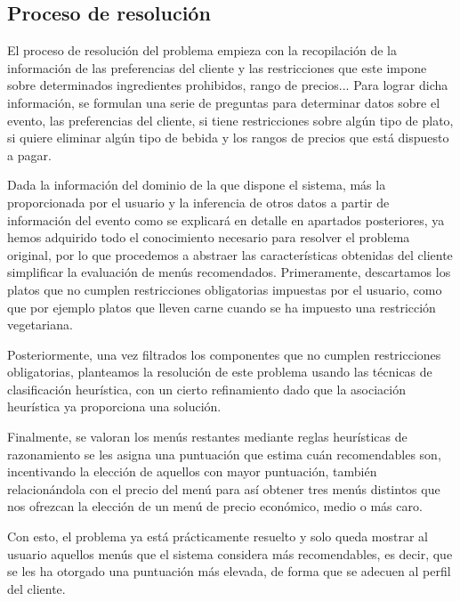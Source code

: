 \documentclass{article}
\begin{document}
\subsection{Proceso de resolución}
El proceso de resolución del problema empieza con la recopilación de la información de las preferencias del cliente y las restricciones que este impone sobre determinados ingredientes prohibidos, rango de precios... Para lograr dicha información, se formulan una serie de preguntas para determinar datos sobre el evento, las preferencias del cliente, si tiene restricciones sobre algún tipo de plato, si quiere eliminar algún tipo de bebida y los rangos de precios que está  dispuesto a pagar.
\par
Dada la información del dominio de la que dispone el sistema, más la proporcionada por el usuario y la inferencia de otros datos a partir de información del evento como se explicará en detalle en apartados posteriores, ya hemos adquirido todo el conocimiento necesario para resolver el problema original, por lo que procedemos a abstraer las características obtenidas del cliente simplificar la evaluación de menús recomendados. Primeramente, descartamos los platos que no cumplen restricciones obligatorias impuestas por el usuario, como que por ejemplo platos que lleven carne cuando se ha impuesto una restricción vegetariana.
\par
Posteriormente, una vez filtrados los componentes que no cumplen restricciones obligatorias, planteamos la resolución de este problema usando las técnicas de clasificación heurística, con un cierto refinamiento dado que la asociación heurística ya proporciona una solución.
\par
Finalmente, se valoran los menús restantes mediante reglas heurísticas de razonamiento  se les asigna una puntuación que estima cuán recomendables son, incentivando la elección de aquellos con mayor puntuación, también relacionándola con el precio del menú para así obtener tres menús distintos que nos ofrezcan la elección de un menú de precio económico, medio o más caro.
\par
Con esto, el problema ya está prácticamente resuelto y solo queda mostrar al usuario aquellos menús que el sistema considera más recomendables, es decir, que se les ha otorgado una puntuación más elevada, de forma que se adecuen al perfil del cliente.
\end{document}
